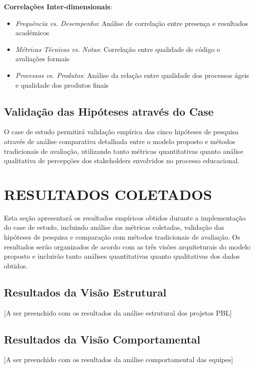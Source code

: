 \documentclass[12pt, a4paper, oneside]{abntex2}
\begin{document}
\textbf{Correlações Inter-dimensionais}:
\begin{itemize}
\item \textit{Frequência vs. Desempenho}: Análise de correlação entre presença e resultados académicos
\item \textit{Métricas Técnicas vs. Notas}: Correlação entre qualidade de código e avaliações formais
\item \textit{Processos vs. Produtos}: Análise da relação entre qualidade dos processos ágeis e qualidade dos produtos finais
\end{itemize}

\subsection{Validação das Hipóteses através do Case}

O case de estudo permitirá validação empírica das cinco hipóteses de pesquisa através de análise comparativa detalhada entre o modelo proposto e métodos tradicionais de avaliação, utilizando tanto métricas quantitativas quanto análise qualitativa de percepções dos stakeholders envolvidos no processo educacional.

\section{RESULTADOS COLETADOS}

Esta seção apresentará os resultados empíricos obtidos durante a implementação do case de estudo, incluindo análise das métricas coletadas, validação das hipóteses de pesquisa e comparação com métodos tradicionais de avaliação. Os resultados serão organizados de acordo com as três visões arquiteturais do modelo proposto e incluirão tanto análises quantitativas quanto qualitativas dos dados obtidos.

\subsection{Resultados da Visão Estrutural}

[A ser preenchido com os resultados da análise estrutural dos projetos PBL]

\subsection{Resultados da Visão Comportamental}

[A ser preenchido com os resultados da análise comportamental das equipes]
\end{document}

